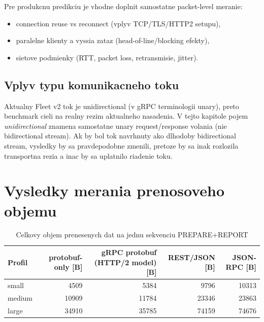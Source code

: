 \documentclass[12pt,a4paper]{report}
\begin{document}
Pre produkcnu predikciu je vhodne doplnit samostatne packet-level meranie:
\begin{itemize}
  \item connection reuse vs reconnect (vplyv TCP/TLS/HTTP2 setupu),
  \item paralelne klienty a vyssia zataz (head-of-line/blocking efekty),
  \item sietove podmienky (RTT, packet loss, retransmisie, jitter).
\end{itemize}

\subsection{Vplyv typu komunikacneho toku}

Aktualny Fleet v2 tok je unidirectional (v gRPC terminologii unary),
preto benchmark cieli na realny rezim aktualneho nasadenia.
V tejto kapitole pojem \textit{unidirectional} znamena samostatne unary
request/response volania (nie bidirectional stream).
Ak by bol tok navrhnuty ako dlhodoby bidirectional stream, vysledky by sa
pravdepodobne zmenili, pretoze by sa inak rozlozila transportna rezia
a inac by sa uplatnilo riadenie toku.

\section{Vysledky merania prenosoveho objemu}

\begin{table}[htbp]
\centering
\caption{Celkovy objem prenesenych dat na jednu sekvenciu PREPARE+REPORT}
\label{tab:transport-bytes-profile}
\begin{tabular}{|l|r|r|r|r|}
\hline
Profil & protobuf-only [B] & gRPC protobuf (HTTP/2 model) [B] & REST/JSON [B] & JSON-RPC [B] \\
\hline
small  & 4509  & 5384  & 9796  & 10313 \\
medium & 10909 & 11784 & 23346 & 23863 \\
large  & 34910 & 35785 & 74159 & 74676 \\
\hline
\end{tabular}
\end{table}
\end{document}
